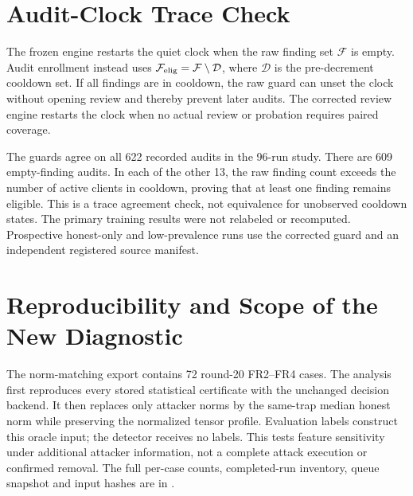 \documentclass[journal]{IEEEtran}
\begin{document}
\section{Audit-Clock Trace Check}\label{app:audit-clock}
The frozen engine restarts the quiet clock when the raw finding set
$\mathcal F$ is empty. Audit enrollment instead uses
$\mathcal F_{\rm elig}=\mathcal F\setminus\mathcal D$, where $\mathcal D$
is the pre-decrement cooldown set. If all findings are in cooldown,
the raw guard can unset the clock without opening review and thereby
prevent later audits. The corrected review engine restarts the clock
when no actual review or probation requires paired coverage.

The guards agree on all 622 recorded audits in the 96-run study.
There are 609 empty-finding audits. In each of the other 13, the raw
finding count exceeds the number of active clients in cooldown, proving
that at least one finding remains eligible. This is a trace agreement
check, not equivalence for unobserved cooldown states. The primary
training results were not relabeled or recomputed. Prospective honest-only
and low-prevalence runs use the corrected guard and an independent
registered source manifest.

\section{Reproducibility and Scope of the New Diagnostic}
The norm-matching export contains 72 round-20 FR2--FR4 cases. The analysis
first reproduces every stored statistical certificate with the unchanged
decision backend. It then replaces only attacker norms by the same-trap
median honest norm while preserving the normalized tensor profile.
Evaluation labels construct this oracle input; the detector receives no
labels. This tests feature sensitivity under additional attacker
information, not a complete attack execution or confirmed removal.
The full per-case counts, completed-run inventory, queue snapshot and
input hashes are in .



\end{document}

